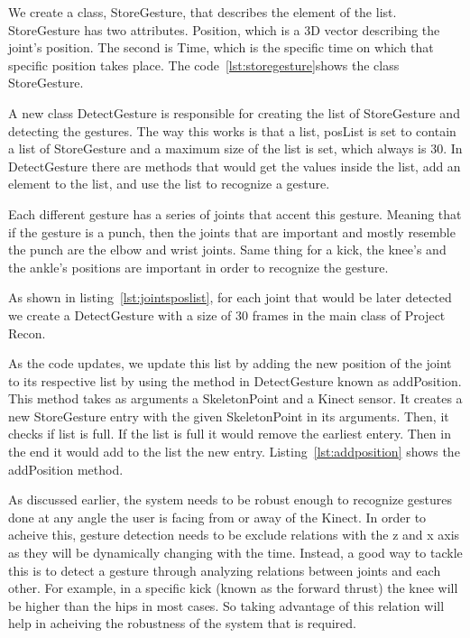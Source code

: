 We create a class, StoreGesture, that describes the element of the list. StoreGesture has two attributes. Position, which is a 3D vector describing the joint's position. The second is Time, which is the specific time on which that specific position takes place. The code~\ref{lst:storegesture}shows the class StoreGesture.



A new class  DetectGesture is responsible for creating the list of StoreGesture and detecting the gestures. The way this works is that a list, posList is set to contain a list of StoreGesture and a maximum size of the list is set, which always is 30. In DetectGesture there are methods that would get the values inside the list, add an element to the list, and use the list to recognize a gesture.

Each different gesture has a series of joints that accent this gesture. Meaning that if the gesture is a punch, then the joints that are important and mostly resemble the punch are the elbow and wrist joints. Same thing for a kick, the knee's and the ankle's positions are important in order to recognize the gesture.

As shown in listing~\ref{lst:jointsposlist}, for each joint that would be later detected we create a DetectGesture with a size of 30 frames in the main class of Project Recon.



As the code updates, we update this list by adding the new position of the joint to its respective list by using the method in DetectGesture known as addPosition. This method takes as arguments a SkeletonPoint and a Kinect sensor. It creates a new StoreGesture entry with the given SkeletonPoint in its arguments. Then, it checks if list is full. If the list is full it would remove the earliest entery. Then in the end it would add to the list the new entry. Listing~\ref{lst:addposition} shows the addPosition method.



As discussed earlier, the system needs to be robust enough to recognize gestures done at any angle the user is facing from or away of the Kinect. In order to acheive this, gesture detection needs to be exclude relations with the z and x axis as they will be dynamically changing with the time. Instead, a good way to tackle this is to detect a gesture through analyzing relations between joints and each other. For example, in a specific kick (known as the forward thrust) the knee will be higher than the hips in most cases. So taking advantage of this relation will help in acheiving the robustness of the system that is required.

